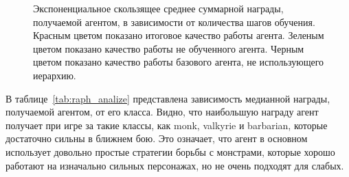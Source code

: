 \begin{figure}[ht]
\caption{Экспоненциальное скользящее среднее суммарной награды, получаемой агентом, в зависимости от количества шагов обучения. Красным цветом показано итоговое качество работы агента. Зеленым цветом показано качество работы не обученного агента. Черным цветом показано качество работы базового агента, не использующего иерархию.}
    \label{fig:raph_train}
\end{figure}


В таблице~\ref{tab:raph_analize} представлена зависимость медианной награды, получаемой агентом, от его класса. Видно, что наибольшую награду агент получает при игре за такие классы, как monk, valkyrie и barbarian, которые достаточно сильны в ближнем бою. Это означает, что агент в основном использует довольно простые стратегии борьбы с монстрами, которые хорошо работают на изначально сильных персонажах, но не очень подходят для слабых. 


